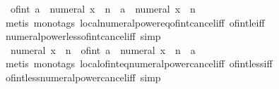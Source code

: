 \begin{isabellebody}
\ \ {\isachardoublequoteopen}of{\isacharunderscore}{\kern0pt}int\ a\ {\isasymle}\ numeral\ x\ {\isacharcircum}{\kern0pt}\ n\ {\isasymlongleftrightarrow}\ a\ {\isasymle}\ numeral\ x\ {\isacharcircum}{\kern0pt}\ n{\isachardoublequoteclose}\isanewline
%
\isadelimproof
\ \ %
\endisadelimproof
%
\isatagproof
{}\isamarkupfalse%
\ {\isacharparenleft}{\kern0pt}metis\ {\isacharparenleft}{\kern0pt}mono{\isacharunderscore}{\kern0pt}tags{\isacharparenright}{\kern0pt}\ local{\isachardot}{\kern0pt}numeral{\isacharunderscore}{\kern0pt}power{\isacharunderscore}{\kern0pt}eq{\isacharunderscore}{\kern0pt}of{\isacharunderscore}{\kern0pt}int{\isacharunderscore}{\kern0pt}cancel{\isacharunderscore}{\kern0pt}iff\ of{\isacharunderscore}{\kern0pt}int{\isacharunderscore}{\kern0pt}le{\isacharunderscore}{\kern0pt}iff{\isacharparenright}{\kern0pt}%
\endisatagproof
{\isafoldproof}%
%
\isadelimproof
\isanewline
%
\endisadelimproof
\isanewline
{}\isamarkupfalse%
\ numeral{\isacharunderscore}{\kern0pt}power{\isacharunderscore}{\kern0pt}less{\isacharunderscore}{\kern0pt}of{\isacharunderscore}{\kern0pt}int{\isacharunderscore}{\kern0pt}cancel{\isacharunderscore}{\kern0pt}iff\ {\isacharbrackleft}{\kern0pt}simp{\isacharbrackright}{\kern0pt}{\isacharcolon}{\kern0pt}\isanewline
\ \ {\isachardoublequoteopen}numeral\ x\ {\isacharcircum}{\kern0pt}\ n\ {\isacharless}{\kern0pt}\ of{\isacharunderscore}{\kern0pt}int\ a\ {\isasymlongleftrightarrow}\ numeral\ x\ {\isacharcircum}{\kern0pt}\ n\ {\isacharless}{\kern0pt}\ a{\isachardoublequoteclose}\isanewline
%
\isadelimproof
\ \ %
\endisadelimproof
%
\isatagproof
{}\isamarkupfalse%
\ {\isacharparenleft}{\kern0pt}metis\ {\isacharparenleft}{\kern0pt}mono{\isacharunderscore}{\kern0pt}tags{\isacharparenright}{\kern0pt}\ local{\isachardot}{\kern0pt}of{\isacharunderscore}{\kern0pt}int{\isacharunderscore}{\kern0pt}eq{\isacharunderscore}{\kern0pt}numeral{\isacharunderscore}{\kern0pt}power{\isacharunderscore}{\kern0pt}cancel{\isacharunderscore}{\kern0pt}iff\ of{\isacharunderscore}{\kern0pt}int{\isacharunderscore}{\kern0pt}less{\isacharunderscore}{\kern0pt}iff{\isacharparenright}{\kern0pt}%
\endisatagproof
{\isafoldproof}%
%
\isadelimproof
\isanewline
%
\endisadelimproof
\isanewline
{}\isamarkupfalse%
\ of{\isacharunderscore}{\kern0pt}int{\isacharunderscore}{\kern0pt}less{\isacharunderscore}{\kern0pt}numeral{\isacharunderscore}{\kern0pt}power{\isacharunderscore}{\kern0pt}cancel{\isacharunderscore}{\kern0pt}iff\ {\isacharbrackleft}{\kern0pt}simp{\isacharbrackright}{\kern0pt}{\isacharcolon}{\kern0pt}\isanewline

\end{isabellebody}

